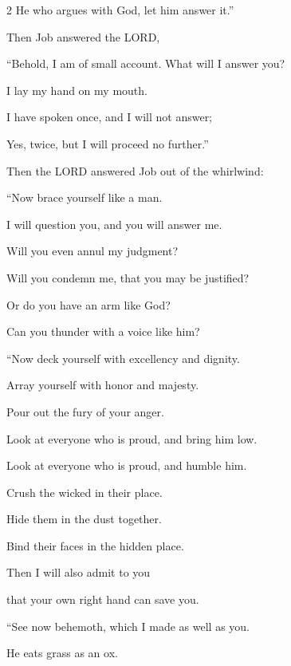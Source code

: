 \begin{multicols}{2}
	He who argues with God, let him answer it.”
	
	\vspace{\baselineskip}
	
	\myverse{}Then Job answered the LORD,
	
	\myverse{}“Behold, I am of small account. What will I answer you?
	
	I lay my hand on my mouth.
	
	\myverse{}I have spoken once, and I will not answer;
	
	Yes, twice, but I will proceed no further.”
	
\vspace{\baselineskip}
	
	\myverse{}Then the LORD answered Job out of the whirlwind:
	
	\myverse{}“Now brace yourself like a man.
	
	I will question you, and you will answer me.
	
	\myverse{}Will you even annul my judgment?
	
	Will you condemn me, that you may be justified?
	
	\myverse{}Or do you have an arm like God?
	
	Can you thunder with a voice like him?
	
	\vspace{\baselineskip}
	
	\myverse{}“Now deck yourself with excellency and dignity.
	
	Array yourself with honor and majesty.
	
	\myverse{}Pour out the fury of your anger.
	
	Look at everyone who is proud, and bring him low.
	
	\myverse{}Look at everyone who is proud, and humble him.
	
	Crush the wicked in their place.
	
	\myverse{}Hide them in the dust together.
	
	Bind their faces in the hidden place.
	
	\myverse{}Then I will also admit to you
	
	that your own right hand can save you.
	
	\vspace{\baselineskip}
	
	\myverse{}“See now behemoth, which I made as well as you.
	
	He eats grass as an ox.
	

\end{multicols}
